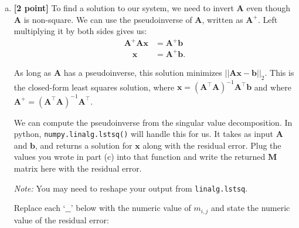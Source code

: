 \begin{enumerate}[(a)]
\pagebreak
\item \textbf{[2 point]} To find a solution to our system, we need to invert $\bm{A}$ even though $\bm{A}$ is non-square. We can use the pseudoinverse of $\bm{A}$, written as $\bm{A}^+$. Left multiplying it by both sides gives us:
\begin{align*}
 \bm{A}^+ \bm{A}\bm{x} &= \bm{A}^+ \bm{b}\\
 \quad \bm{x} &= \bm{A}^+ \bm{b}.
\end{align*}

As long as $\bm{A}$ has a pseudoinverse, this solution minimizes $||\bm{A}\bm{x} - \bm{b}||_2$. This is the closed-form least squares solution, where $\bm{x} = (\bm{A}^\top \bm{A})^{-1}\bm{A}^\top\bm{b}$ and where $\bm{A}^+ = (\bm{A}^\top \bm{A})^{-1}\bm{A}^\top$.

We can compute the pseudoinverse from the singular value decomposition. In python, \texttt{numpy.linalg.lstsq()} will handle this for us. It takes as input $\bm{A}$ and $\bm{b}$, and returns a solution for $\bm{x}$ along with the residual error. Plug the values you wrote in part (c) into that function and write the returned $\bm{M}$ matrix here with the residual error.

\textit{Note:} You may need to reshape your output from \texttt{linalg.lstsq}.

\begin{tcolorbox}[colback=orange!5!white,colframe=orange!75!black]
Replace each `$\_\_$' below with the numeric value of $m_{i, j}$ and state the numeric value of the residual error:
\end{tcolorbox}



\end{enumerate}
